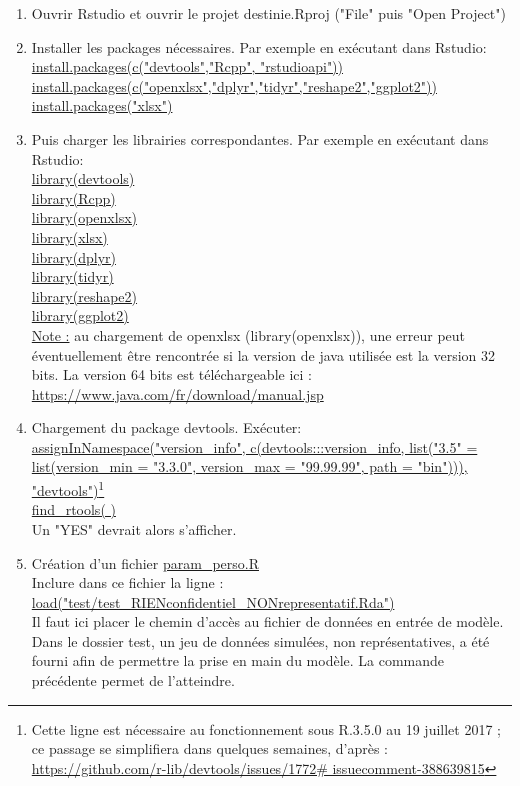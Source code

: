 \begin{enumerate}
\item Ouvrir Rstudio et ouvrir le projet destinie.Rproj ("File" puis "Open Project")

\item Installer les packages nécessaires.
Par exemple en exécutant dans Rstudio:\\
\url{install.packages(c("devtools","Rcpp", "rstudioapi"))}\\ \url{install.packages(c("openxlsx","dplyr","tidyr","reshape2","ggplot2"))}\\  
\url{install.packages("xlsx")}\\

\item Puis charger les librairies correspondantes.
Par exemple en exécutant dans Rstudio:\\
    \url{library(devtools)} \\
    \url{library(Rcpp)} \\
    \url{library(openxlsx)} \\
    \url{library(xlsx)} \\
    \url{library(dplyr)} \\
    \url{library(tidyr)} \\
    \url{library(reshape2)} \\
    \url{library(ggplot2)} \\
\underline{Note :} au chargement de openxlsx (library(openxlsx)), une erreur peut éventuellement être rencontrée si la version de java utilisée est la version 32 bits. La version 64 bits est téléchargeable ici : \url{https://www.java.com/fr/download/manual.jsp}\\

\item Chargement du package devtools. Exécuter: \\
 \url{assignInNamespace("version_info", c(devtools:::version_info, list("3.5" = list(version_min = "3.3.0", version_max = "99.99.99", path = "bin"))), "devtools")}\footnote{Cette ligne est nécessaire au fonctionnement sous R.3.5.0 au 19 juillet 2017 ; ce passage se simplifiera dans quelques semaines, d’après : \url{https://github.com/r-lib/devtools/issues/1772\# issuecomment-388639815}}  \\
 
 \url{find_rtools( )}  \\
 Un "YES" devrait alors s'afficher.
 
 \item Création d'un fichier \url{param_perso.R} \\
Inclure dans ce fichier la ligne : \\
\url{load("test/test_RIENconfidentiel_NONrepresentatif.Rda")}\\
Il faut ici placer le chemin d'accès au fichier de données en entrée de modèle. Dans le dossier test, un jeu de données simulées, non représentatives, a été fourni afin de permettre la prise en main du modèle. La commande précédente permet de l'atteindre.\\


\end{enumerate}
